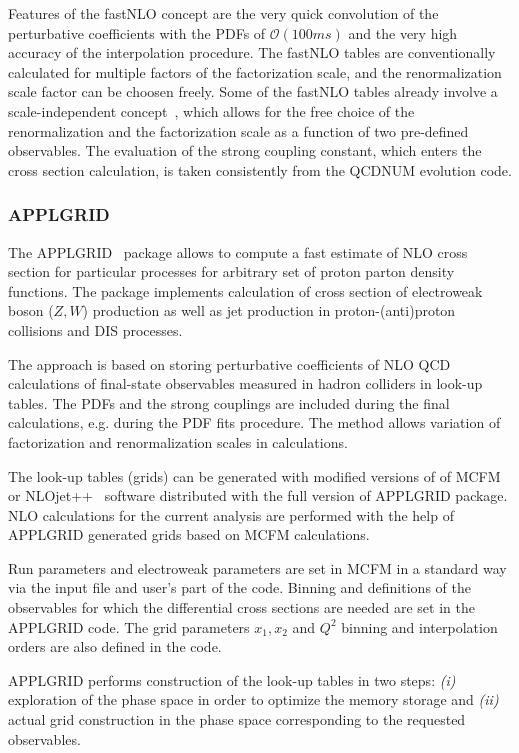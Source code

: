 \documentclass[11pt,a4paper]{article}
\begin{document}
Features of the fastNLO concept are the very quick convolution of the
perturbative coefficients with the PDFs of
$\mathcal{O}(100 ms)$ and the very high accuracy
of the interpolation procedure. 
The fastNLO tables are conventionally calculated
for multiple factors of the factorization scale, 
and the renormalization scale factor can be choosen freely.
Some of the fastNLO tables already involve a scale-independent
concept~\cite{Britzger:2012bs}, which allows for 
the free choice of the renormalization and the factorization
scale as a function of two pre-defined observables.
The evaluation of the strong coupling constant, which enters
the cross section calculation, is taken consistently from the 
QCDNUM evolution code.


\subsubsection{APPLGRID}
The APPLGRID~\cite{Carli:2010rw} package allows to compute a fast estimate
of NLO cross section for particular processes for arbitrary set of 
proton parton density functions. The package implements
calculation of cross section of electroweak boson (\(Z,W\))
production as well as jet production in proton-(anti)proton
collisions and DIS processes. 

The approach is based on storing perturbative coefficients
of NLO QCD calculations of final-state observables measured
in hadron colliders in look-up tables. The PDFs and the 
strong couplings are included during the final calculations,
e.g. during the PDF fits procedure. The method allows 
variation of factorization and renormalization scales in
calculations.

The look-up tables (grids) can be generated with modified versions of
of MCFM~\cite{Campbell:1999ah,Campbell:2010ff} or 
NLOjet++~\cite{Nagy:2001fj} software distributed
with the full version of APPLGRID package. NLO calculations
for the current analysis are performed with the help of APPLGRID
generated grids based on MCFM calculations. 

Run parameters
and electroweak parameters are set in MCFM in a standard way
via the input file and user's part of the code. 
Binning and definitions of the observables for which the
differential cross sections are needed are set in the 
APPLGRID code. 
The grid parameters \(x_1, x_2\) and \(Q^2\) binning
and interpolation orders are also defined in the code.

APPLGRID performs construction of the look-up tables in two 
steps: {\it (i)} exploration of the phase space in order
to optimize the memory storage and {\it (ii)} actual grid
construction in the phase space corresponding to the 
requested observables.
\end{document}
